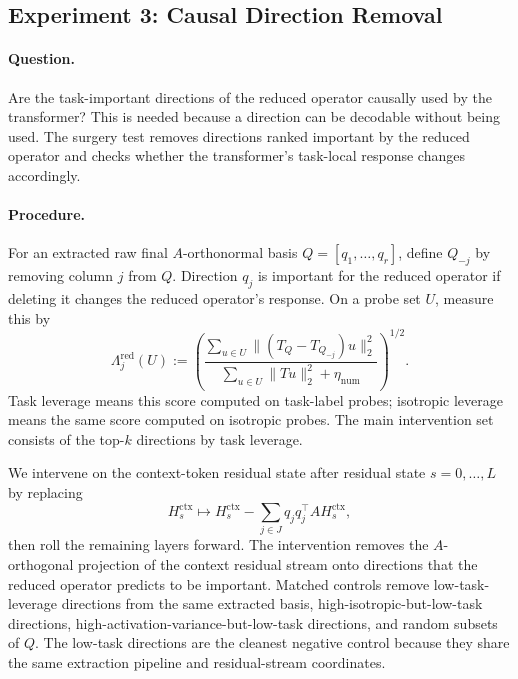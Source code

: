 \documentclass[11pt]{article}
\begin{document}
\FloatBarrier

\subsection{Experiment 3: Causal Direction Removal}

\paragraph{Question.}
Are the task-important directions of the reduced operator causally used by the transformer? This is
needed because a direction can be decodable without being used. The surgery test removes
directions ranked important by the reduced operator and checks whether the transformer's
task-local response changes accordingly.

\paragraph{Procedure.}
For an extracted raw final \(A\)-orthonormal basis \(Q=[q_1,\ldots,q_r]\), define \(Q_{-j}\) by
removing column \(j\) from \(Q\). Direction \(q_j\) is important for the reduced operator if deleting
it changes the reduced operator's response. On a probe set \(U\), measure this by
\[
\Lambda_j^{\mathrm{red}}(U)
:=
\left(
\frac{
\sum_{u\in U}\|(T_Q-T_{Q_{-j}})u\|_2^2
}{
\sum_{u\in U}\|Tu\|_2^2+\eta_{\mathrm{num}}
}
\right)^{1/2}.
\]
Task leverage means this score computed on task-label probes; isotropic leverage means the same
score computed on isotropic probes. The main intervention set consists of the top-\(k\) directions
by task leverage.

We intervene on the context-token residual state after residual state \(s=0,\ldots,L\) by replacing
\[
H_s^{\mathrm{ctx}}
\longmapsto
H_s^{\mathrm{ctx}}
-
\sum_{j\in J}q_jq_j^\top AH_s^{\mathrm{ctx}},
\]
then roll the remaining layers forward. The intervention removes the \(A\)-orthogonal projection
of the context residual stream onto directions that the reduced operator predicts to be important.
Matched controls remove low-task-leverage directions from the same extracted basis,
high-isotropic-but-low-task directions, high-activation-variance-but-low-task directions, and random
subsets of \(Q\). The low-task directions are the cleanest negative control because they share the
same extraction pipeline and residual-stream coordinates.
\end{document}
